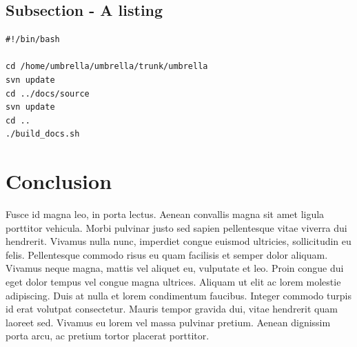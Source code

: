 \subsection{Subsection - A listing}



\lstset{tabsize=2,language=bash}
\begin{lstlisting}[breaklines=true,frame=single,caption={Shellscript that handles the complete build process of the documentation},label=lst:cron-job]
#!/bin/bash

cd /home/umbrella/umbrella/trunk/umbrella
svn update
cd ../docs/source
svn update
cd ..
./build_docs.sh
\end{lstlisting}




\newpage
\section{Conclusion}
Fusce id magna leo, in porta lectus. Aenean convallis magna sit amet ligula
porttitor vehicula. Morbi pulvinar justo sed sapien pellentesque vitae viverra
dui hendrerit. Vivamus nulla nunc, imperdiet congue euismod ultricies,
sollicitudin eu felis. Pellentesque commodo risus eu quam facilisis et semper
dolor aliquam. Vivamus neque magna, mattis vel aliquet eu, vulputate et leo.
Proin congue dui eget dolor tempus vel congue magna ultrices. Aliquam ut elit
ac lorem molestie adipiscing. Duis at nulla et lorem condimentum faucibus.
Integer commodo turpis id erat volutpat consectetur. Mauris tempor gravida
dui, vitae hendrerit quam laoreet sed. Vivamus eu lorem vel massa pulvinar
pretium. Aenean dignissim porta arcu, ac pretium tortor placerat porttitor. 







